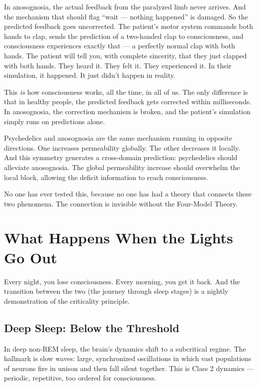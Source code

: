 \documentclass[11pt, twoside, openright]{book}
\begin{document}
In anosognosia, the actual feedback from the paralyzed limb never arrives. And the mechanism that should flag ``wait --- nothing happened'' is damaged. So the predicted feedback goes uncorrected. The patient's motor system commands both hands to clap, sends the prediction of a two-handed clap to consciousness, and consciousness experiences exactly that --- a perfectly normal clap with both hands. The patient will tell you, with complete sincerity, that they just clapped with both hands. They heard it. They felt it. They experienced it. In their simulation, it happened. It just didn't happen in reality.

This \textit{is} how consciousness works, all the time, in all of us. The only difference is that in healthy people, the predicted feedback gets corrected within milliseconds. In anosognosia, the correction mechanism is broken, and the patient's simulation simply runs on predictions alone.

Psychedelics and anosognosia are the same mechanism running in opposite directions. One increases permeability globally. The other decreases it locally. And this symmetry generates a cross-domain prediction: psychedelics should alleviate anosognosia. The global permeability increase should overwhelm the local block, allowing the deficit information to reach consciousness.

No one has ever tested this, because no one has had a theory that connects these two phenomena. The connection is invisible without the Four-Model Theory.


\chapter{What Happens When the Lights Go Out}

Every night, you lose consciousness. Every morning, you get it back. And the transition between the two (the journey through sleep stages) is a nightly demonstration of the criticality principle.

\section*{Deep Sleep: Below the Threshold}

In deep non-REM sleep, the brain's dynamics shift to a subcritical regime. The hallmark is slow waves: large, synchronized oscillations in which vast populations of neurons fire in unison and then fall silent together. This is Class 2 dynamics --- periodic, repetitive, too ordered for consciousness.
\end{document}
